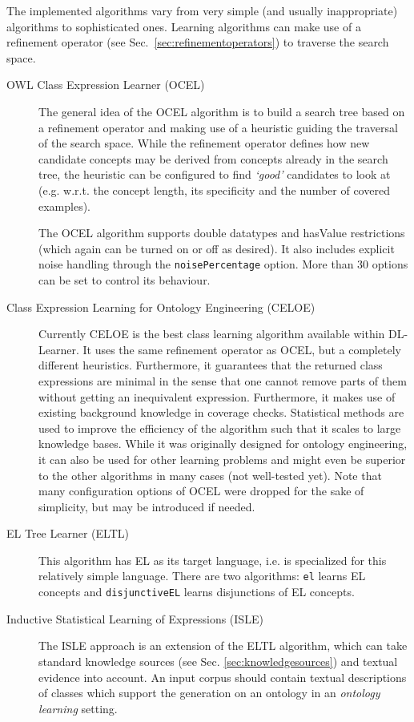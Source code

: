 \documentclass[a4paper,12pt]{scrartcl}
\begin{document}
The implemented algorithms vary from very simple (and usually inappropriate) algorithms to sophisticated ones.
Learning algorithms can make use of a refinement operator (see Sec.~\ref{sec:refinementoperators}) to traverse the search space.

\begin{description}
 \item[OWL Class Expression Learner (OCEL)]
 The general idea of the OCEL algorithm is to build a search tree based on a refinement operator and making use of a heuristic guiding the traversal of the search space.
 While the refinement operator defines how new candidate concepts may be derived from concepts already in the search tree, the heuristic can be configured to find \emph{`good'} candidates to look at (e.g. w.r.t. the concept length, its specificity and the number of covered examples).
 
 The OCEL algorithm supports double datatypes and hasValue restrictions (which again can be turned on or off as desired).
 It also includes explicit noise handling through the \verb|noisePercentage| option.
 More than 30 options can be set to control its behaviour.

 \item[Class Expression Learning for Ontology Engineering (CELOE)] Currently CELOE is the best class learning algorithm available within DL-Learner. It uses the same refinement operator as OCEL, but a completely different heuristics. Furthermore, it guarantees that the returned class expressions are minimal in the sense that one cannot remove parts of them without getting an inequivalent expression. Furthermore, it makes use of existing background knowledge in coverage checks. Statistical methods are used to improve the efficiency of the algorithm such that it scales to large knowledge bases. While it was originally designed for ontology engineering, it can also be used for other learning problems and might even be superior to the other algorithms in many cases (not well-tested yet). Note that many configuration options of OCEL were dropped for the sake of simplicity, but may be introduced if needed.
 \item[EL Tree Learner (ELTL)] This algorithm has EL as its target language, i.e. is specialized for this relatively simple language. There are two algorithms: \verb|el| learns EL concepts and \verb|disjunctiveEL| learns disjunctions of EL concepts.
 \item[Inductive Statistical Learning of Expressions (ISLE)]
 The ISLE approach \cite{Buehmann2014_short} is an extension of the ELTL algorithm, which can take standard knowledge sources (see Sec. \ref{sec:knowledgesources}) and textual evidence into account.
 An input corpus should contain textual descriptions of classes which support the generation on an ontology in an \emph{ontology learning} setting.
\end{description}
\end{document}

